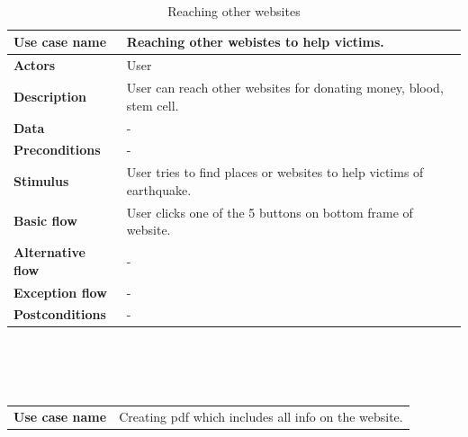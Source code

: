 \begin{center}
    ~\\~\\~\\
    \begin{table}[H]
        \begin{tabular}{| m{3cm}| m{10cm} |}
            \hline
            \textbf{Use case name}    & Reaching other webistes to help victims.                             \\
            \hline
            \textbf{Actors}           & User                                                                 \\
            \hline
            \textbf{Description}      & User can reach other websites for donating money, blood, stem cell.  \\
            \hline
            \textbf{Data}             & -                                                                    \\
            \hline
            \textbf{Preconditions}    & -                                                                    \\
            \hline
            \textbf{Stimulus}         & User tries to find places or websites to help victims of earthquake. \\
            \hline
            \textbf{Basic flow}       & User clicks one of the 5 buttons on bottom frame of website.         \\
            \hline
            \textbf{Alternative flow} & -                                                                    \\
            \hline
            \textbf{Exception flow}   & -                                                                    \\
            \hline
            \textbf{Postconditions}   & -                                                                    \\
            \hline
        \end{tabular}
        \caption[Reaching other websites]{Reaching other websites}
    \end{table}
    ~\\~\\~\\
    \begin{table}[H]
        \begin{tabular}{| m{3cm}| m{10cm} |}
            \hline
            \textbf{Use case name}    & Creating pdf which includes all info on the website.                                                                                          \\

\end{tabular}
\end{table}
\end{center}
